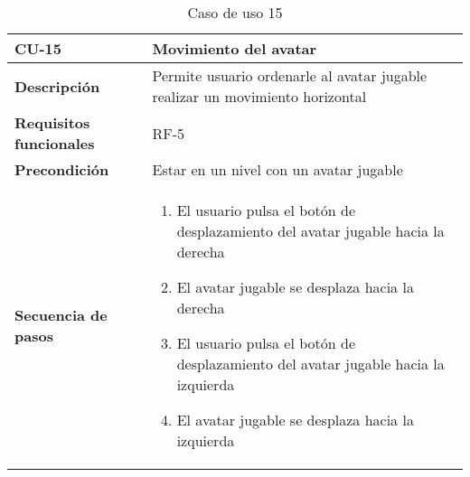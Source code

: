 \begin{longtable}{l|l}
\caption{Caso de uso 15}\\
\begin{minipage}{0.25\columnwidth}
\textbf{CU-15} 
\end{minipage}
&
\begin{minipage}{0.65\columnwidth}
Movimiento del avatar
\end{minipage}
\\ \hline

\begin{minipage}{0.25\columnwidth}
\textbf{Descripción} 
\end{minipage}
&
\begin{minipage}{0.65\columnwidth}
Permite usuario ordenarle al avatar jugable realizar un movimiento horizontal
\end{minipage}
\\ \hline

\begin{minipage}{0.25\columnwidth}
\textbf{Requisitos funcionales} 
\end{minipage}
&
\begin{minipage}{0.65\columnwidth}
RF-5
\end{minipage}
\\ \hline

\begin{minipage}{0.25\columnwidth}
\textbf{Precondición} 
\end{minipage}
&
\begin{minipage}{0.65\columnwidth}
Estar en un nivel con un avatar jugable
\end{minipage}
\\ \hline

\begin{minipage}{0.25\columnwidth}
\textbf{Secuencia de pasos} 
\end{minipage}
&
\begin{minipage}{0.65\columnwidth}
\begin{enumerate}
\item
El usuario pulsa el botón de desplazamiento del avatar jugable hacia la derecha
\item
El avatar jugable se desplaza hacia la derecha
\item
El usuario pulsa el botón de desplazamiento del avatar jugable hacia la izquierda
\item
El avatar jugable se desplaza hacia la izquierda
\end{enumerate}
\end{minipage}
\\ \hline


\end{longtable}
